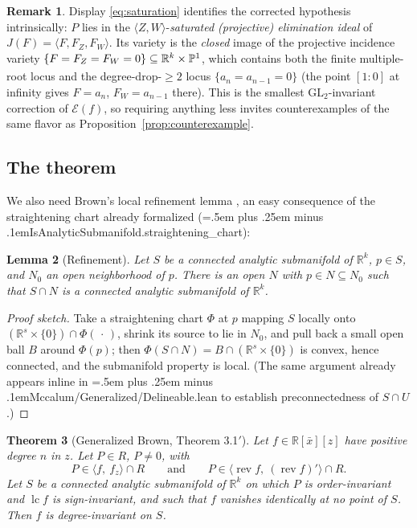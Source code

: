 \documentclass[11pt,a4paper]{article}
\newtheorem{theorem}{Theorem}[section]
\newtheorem{lemma}[theorem]{Lemma}
\theoremstyle{definition}
\newtheorem{remark}[theorem]{Remark}
\newcommand{\R}{\mathbb{R}}
\newcommand{\xb}{\bar{x}}
\newcommand{\lc}{\operatorname{lc}}
\newcommand{\rev}{\operatorname{rev}}
\newcommand{\E}{\mathcal{E}}
\newcommand{\ideal}[1]{\langle #1\rangle}
\newcommand{\code}[1]{{\ttfamily\spaceskip=.5em plus .25em minus .1em\relax #1}}
\begin{document}
\begin{remark}\label{rem:projective}
Display \eqref{eq:saturation} identifies the corrected hypothesis
intrinsically: $P$ lies in the $\ideal{Z,W}$-\emph{saturated (projective)
elimination ideal} of $J(F) = \ideal{F, F_Z, F_W}$. Its variety is the
\emph{closed} image of the projective incidence variety
$\{F = F_Z = F_W = 0\} \subseteq \R^k_{\mathstrut} \times \mathbb{P}^1$, which
contains both the finite multiple-root locus and the
degree-drop-$\ge 2$ locus $\{a_n = a_{n-1} = 0\}$ (the point
$[1:0]$ at infinity gives $F = a_n$, $F_W = a_{n-1}$ there). This is the
smallest $\mathrm{GL}_2$-invariant correction of $\E(f)$, so requiring
anything less invites counterexamples of the same flavor as
Proposition~\ref{prop:counterexample}.
\end{remark}

\subsection{The theorem}

We also need Brown's local refinement lemma \cite[Lemma~8.2]{Brown01}, an easy
consequence of the straightening chart already formalized
(\code{IsAnalyticSubmanifold.straightening\_chart}):

\begin{lemma}[Refinement]\label{lem:refine}
Let $S$ be a connected analytic submanifold of $\R^k$, $p \in S$, and $N_0$ an
open neighborhood of $p$. There is an open $N$ with $p \in N \subseteq N_0$
such that $S \cap N$ is a connected analytic submanifold of $\R^k$.
\end{lemma}

\begin{proof}[Proof sketch]
Take a straightening chart $\Phi$ at $p$ mapping $S$ locally onto
$(\R^s\times\{0\}) \cap \Phi(\,\cdot\,)$, shrink its source to lie in $N_0$,
and pull back a small open ball $B$ around $\Phi(p)$; then
$\Phi(S \cap N) = B \cap (\R^s \times \{0\})$ is convex, hence connected, and
the submanifold property is local. (The same argument already appears inline
in \code{Mccalum/Generalized/Delineable.lean} to establish preconnectedness of
$S \cap U$.)
\end{proof}

\begin{theorem}[Generalized Brown, Theorem 3.1$'$]\label{thm:main}
Let $f \in \R[\xb][z]$ have positive degree $n$ in $z$. Let $P \in R$,
$P \neq 0$, with
\[
  P \in \ideal{f,\ f_z} \cap R
  \qquad\text{and}\qquad
  P \in \ideal{\rev f,\ (\rev f)'} \cap R .
\]
Let $S$ be a connected analytic submanifold of $\R^k$ on which $P$ is
order-invariant and $\lc f$ is sign-invariant, and such that $f$ vanishes
identically at no point of $S$. Then $f$ is degree-invariant on $S$.
\end{theorem}
\end{document}
